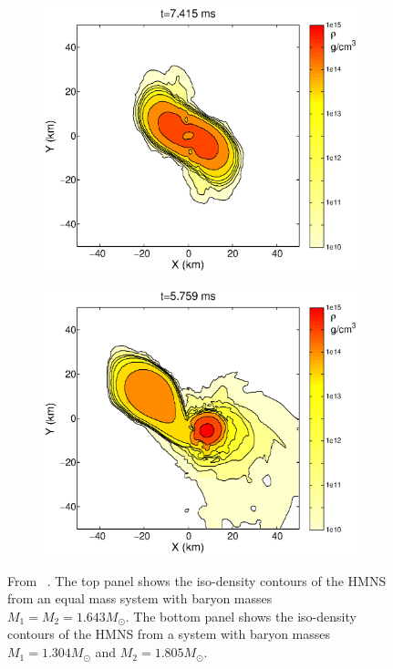\begin{figure}[!t]
\centering
\begin{subfigure}{.80\textwidth}
  \centering
  \includegraphics[width=.95\linewidth]{intro/Contours1}
\end{subfigure}
\begin{subfigure}{.80\textwidth}
  \centering
  \includegraphics[width=.95\linewidth]{intro/Contours2}
\end{subfigure}
\caption[Comparison of an equal mass BNS system and a non-equal mass BNS system.]{From ~\cite{Rezzolla:2010fd}. The top panel shows the iso-density contours of the HMNS from an equal mass system with baryon masses $M_1=M_2=1.643M_{\odot}$. The bottom panel shows the iso-density contours of the HMNS from a system with baryon masses $M_1=1.304M_{\odot}$ and $M_2=1.805M_{\odot}$.}
\label{fig:Contours}
\end{figure}

